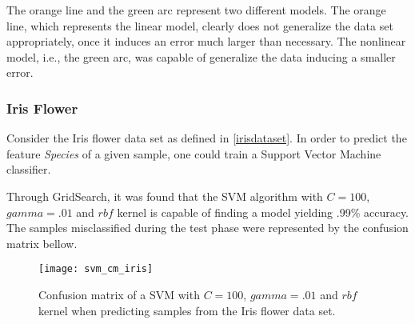 The orange line and the green arc represent two different models. The orange line, which represents the linear model, clearly does not generalize the data set appropriately, once it induces an error much larger than necessary. \cite{roh2015} The nonlinear model, i.e., the green arc, was capable of generalize the data inducing a smaller error.

\subsubsection{Iris Flower}

Consider the Iris flower data set as defined in \ref{irisdataset}. In order to predict the feature {\em Species} of a given sample, one could train a Support Vector Machine classifier.

Through GridSearch, it was found that the SVM algorithm with $C=100$, $gamma=.01$ and $rbf$ kernel is capable of finding a model yielding .99\% accuracy. The samples misclassified during the test phase were represented by the confusion matrix bellow.

\begin{figure}[H]
	\centering
	\captionsetup{justification=centering}

	\texttt{[image: svm\_cm\_iris]}
	\caption{Confusion matrix of a SVM with $C=100$, $gamma=.01$ and $rbf$ kernel when predicting samples from the Iris flower data set.}
	\label{fig:cmsvmiris}
\end{figure}
